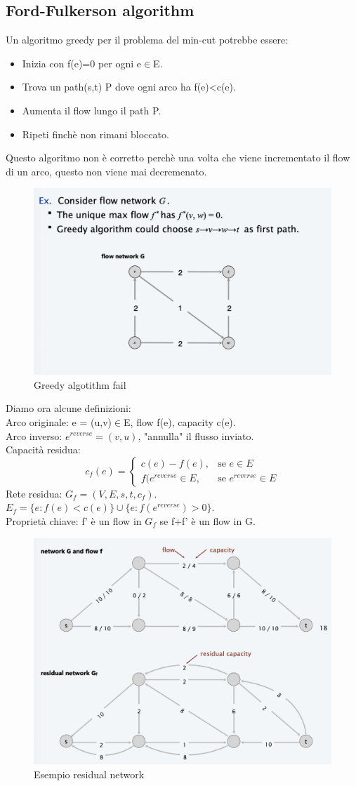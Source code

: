 \documentclass{article}
\begin{document}
\subsection{Ford-Fulkerson algorithm}
Un algoritmo greedy per il problema del min-cut potrebbe essere:
\begin{itemize}
    \item Inizia con f(e)=0 per ogni e$\in$E.
    \item Trova un path(s,t) P dove ogni arco ha f(e)<c(e).
    \item Aumenta il flow lungo il path P.
    \item Ripeti finchè non rimani bloccato.
\end{itemize}
Questo algoritmo non è corretto perchè una volta che viene incrementato il flow di un arco, questo non viene mai decremenato. 
\begin{figure}
    \centering
    \includegraphics[width=0.5\linewidth]{Screenshot 2024-04-26 alle 10.54.59.png}
    \caption{Greedy algotithm fail}
    \label{fig:enter-label}
\end{figure}
Diamo ora alcune definizioni:\\
Arco originale: e = (u,v)$\in$E, flow f(e), capacity c(e).\\
Arco inverso: $e^{reverse}=(v,u)$, "annulla" il flusso inviato.\\
Capacità residua: \[
c_f(e) =\begin{cases} c(e)-f(e), & \mbox{se }e\in E \\ f(e^{reverse}\in E, & \mbox{se }e^{reverse} \in E
\end{cases}
\]
Rete residua: $G_f=(V,E,s,t,c_f)$. $E_f=\{e:f(e)<c(e)\}\cup\{e:f(e^{reverse})>0\}$.\\ Proprietà chiave: f' è un flow in $G_f$ se f+f' è un flow in G.
\begin{figure}[H]
    \centering
    \includegraphics[width=0.5\linewidth]{Screenshot 2024-04-26 alle 11.30.49.png}
    \caption{Esempio residual network}
    \label{fig:enter-label}
\end{figure}
\end{document}
